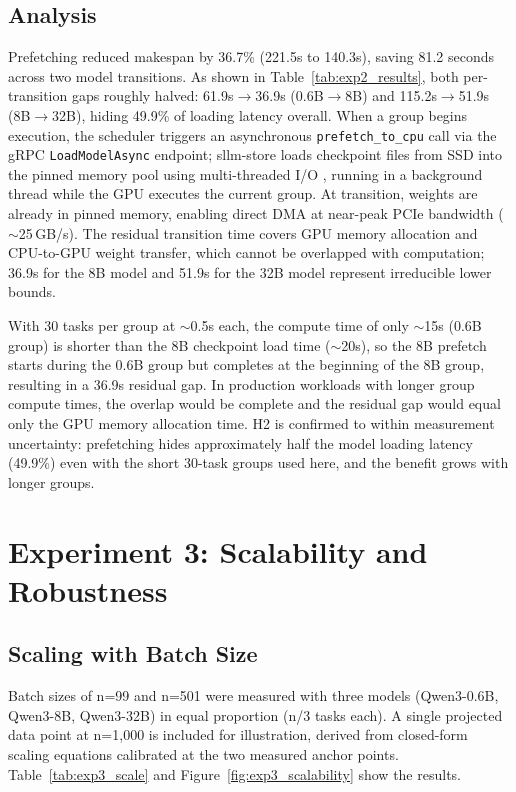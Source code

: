 \documentclass[logo,bsc,singlespacing,parskip,online]{infthesis}
\begin{document}
\subsection{Analysis}

Prefetching reduced makespan by 36.7\% (221.5s to 140.3s), saving 81.2 seconds across two model transitions. As shown in Table~\ref{tab:exp2_results}, both per-transition gaps roughly halved: 61.9s$\to$36.9s (0.6B$\to$8B) and 115.2s$\to$51.9s (8B$\to$32B), hiding 49.9\% of loading latency overall. When a group begins execution, the scheduler triggers an asynchronous \texttt{prefetch\_to\_cpu} call via the gRPC \texttt{LoadModelAsync} endpoint; sllm-store loads checkpoint files from SSD into the pinned memory pool using multi-threaded I/O \citep{cuda_guide2024}, running in a background thread while the GPU executes the current group. At transition, weights are already in pinned memory, enabling direct DMA at near-peak PCIe bandwidth ($\sim$25\,GB/s). The residual transition time covers GPU memory allocation and CPU-to-GPU weight transfer, which cannot be overlapped with computation; 36.9s for the 8B model and 51.9s for the 32B model represent irreducible lower bounds.

With 30 tasks per group at $\sim$0.5s each, the compute time of only $\sim$15s (0.6B group) is shorter than the 8B checkpoint load time ($\sim$20s), so the 8B prefetch starts during the 0.6B group but completes at the beginning of the 8B group, resulting in a 36.9s residual gap. In production workloads with longer group compute times, the overlap would be complete and the residual gap would equal only the GPU memory allocation time. H2 is confirmed to within measurement uncertainty: prefetching hides approximately half the model loading latency (49.9\%) even with the short 30-task groups used here, and the benefit grows with longer groups.

\section{Experiment 3: Scalability and Robustness}


\subsection{Scaling with Batch Size}

Batch sizes of n=99 and n=501 were measured with three models (Qwen3-0.6B, Qwen3-8B, Qwen3-32B) in equal proportion (n/3 tasks each). A single projected data point at n=1,000 is included for illustration, derived from closed-form scaling equations calibrated at the two measured anchor points. Table~\ref{tab:exp3_scale} and Figure~\ref{fig:exp3_scalability} show the results.
\end{document}
